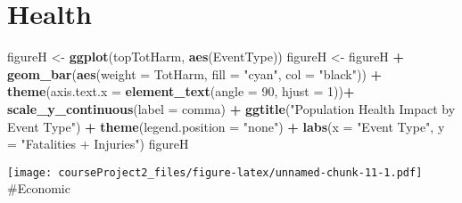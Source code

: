 \documentclass[]{article}
\newenvironment{Shaded}{\begin{snugshade}}{\end{snugshade}}
\newcommand{\KeywordTok}[1]{\textcolor[rgb]{0.13,0.29,0.53}{\textbf{#1}}}
\newcommand{\DataTypeTok}[1]{\textcolor[rgb]{0.13,0.29,0.53}{#1}}
\newcommand{\DecValTok}[1]{\textcolor[rgb]{0.00,0.00,0.81}{#1}}
\newcommand{\StringTok}[1]{\textcolor[rgb]{0.31,0.60,0.02}{#1}}
\newcommand{\OperatorTok}[1]{\textcolor[rgb]{0.81,0.36,0.00}{\textbf{#1}}}
\newcommand{\NormalTok}[1]{#1}
\begin{document}
\section{Health}\label{health}

\begin{Shaded}
\begin{Highlighting}[]
\NormalTok{figureH <-}\StringTok{ }\KeywordTok{ggplot}\NormalTok{(topTotHarm, }\KeywordTok{aes}\NormalTok{(EventType))}
\NormalTok{figureH <-}\StringTok{ }\NormalTok{figureH }\OperatorTok{+}\StringTok{ }\KeywordTok{geom_bar}\NormalTok{(}\KeywordTok{aes}\NormalTok{(}\DataTypeTok{weight =}\NormalTok{ TotHarm, }\DataTypeTok{fill =} \StringTok{"cyan"}\NormalTok{, }\DataTypeTok{col =} \StringTok{"black"}\NormalTok{)) }\OperatorTok{+}
\StringTok{        }\KeywordTok{theme}\NormalTok{(}\DataTypeTok{axis.text.x =} \KeywordTok{element_text}\NormalTok{(}\DataTypeTok{angle =} \DecValTok{90}\NormalTok{, }\DataTypeTok{hjust =} \DecValTok{1}\NormalTok{))}\OperatorTok{+}
\StringTok{        }\KeywordTok{scale_y_continuous}\NormalTok{(}\DataTypeTok{label =}\NormalTok{ comma) }\OperatorTok{+}\StringTok{ }
\StringTok{        }\KeywordTok{ggtitle}\NormalTok{(}\StringTok{"Population Health Impact by Event Type"}\NormalTok{) }\OperatorTok{+}\StringTok{ }
\StringTok{        }\KeywordTok{theme}\NormalTok{(}\DataTypeTok{legend.position =} \StringTok{"none"}\NormalTok{) }\OperatorTok{+}\StringTok{ }
\StringTok{        }\KeywordTok{labs}\NormalTok{(}\DataTypeTok{x =} \StringTok{"Event Type"}\NormalTok{, }\DataTypeTok{y =} \StringTok{"Fatalities + Injuries"}\NormalTok{) }
\NormalTok{figureH}
\end{Highlighting}
\end{Shaded}

\texttt{[image: courseProject2\_files/figure-latex/unnamed-chunk-11-1.pdf]}
\#Economic
\end{document}
